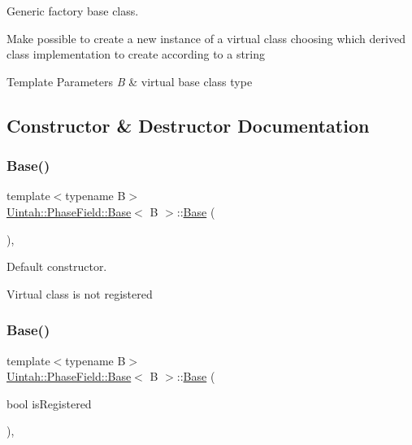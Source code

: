 Generic factory base class. 

Make possible to create a new instance of a virtual class choosing which derived class implementation to create according to a string


\begin{DoxyTemplParams}{Template Parameters}
{\em B} & virtual base class type \\
\hline
\end{DoxyTemplParams}


\subsection{Constructor \& Destructor Documentation}
\mbox{\label{classUintah_1_1PhaseField_1_1Base_af64dc0e6053ade056af9806edce1d852}} 
\subsubsection{\texorpdfstring{Base()}{Base()}\hspace{0.1cm}{\footnotesize\ttfamily [1/2]}}
{\footnotesize\ttfamily template$<$typename B$>$ \\
\hyperlink{classUintah_1_1PhaseField_1_1Base}{Uintah\+::\+Phase\+Field\+::\+Base}$<$ B $>$\+::\hyperlink{classUintah_1_1PhaseField_1_1Base}{Base} (\begin{DoxyParamCaption}{ }\end{DoxyParamCaption})\hspace{0.3cm}{\ttfamily [inline]}, {\ttfamily [protected]}}



Default constructor. 

Virtual class is not registered \mbox{\label{classUintah_1_1PhaseField_1_1Base_a282bf8678ac00386cdd0b4b6b347d516}} 
\subsubsection{\texorpdfstring{Base()}{Base()}\hspace{0.1cm}{\footnotesize\ttfamily [2/2]}}
{\footnotesize\ttfamily template$<$typename B$>$ \\
\hyperlink{classUintah_1_1PhaseField_1_1Base}{Uintah\+::\+Phase\+Field\+::\+Base}$<$ B $>$\+::\hyperlink{classUintah_1_1PhaseField_1_1Base}{Base} (\begin{DoxyParamCaption}\item[{bool}]{is\+Registered }\end{DoxyParamCaption})\hspace{0.3cm}{\ttfamily [inline]}, {\ttfamily [protected]}}



